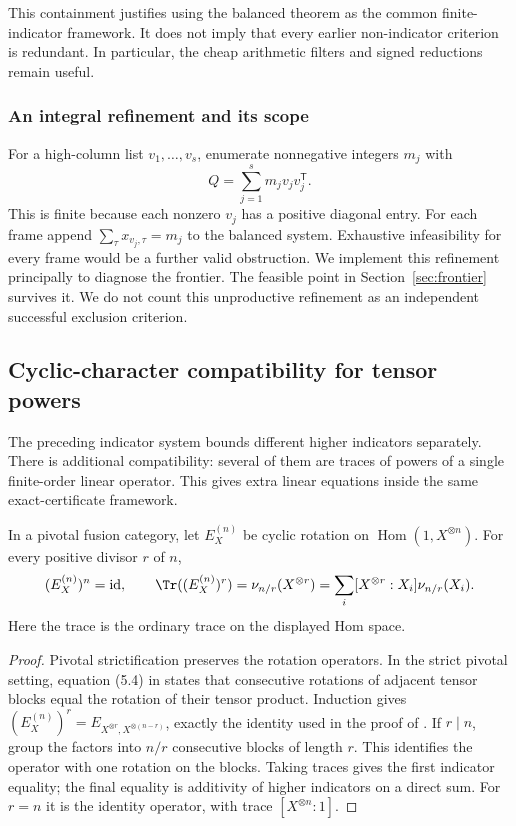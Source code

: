 This containment justifies using the balanced theorem as the common
finite-indicator framework. It does not imply that every earlier
non-indicator criterion is redundant. In particular, the cheap
arithmetic filters and signed reductions remain useful.

\subsubsection{An integral refinement and its scope}
For a high-column list $v_1,\ldots,v_s$, enumerate nonnegative integers
$m_j$ with
\begin{equation}\label{eq:integergram}
 Q=\sum_{j=1}^s m_jv_jv_j^{\mathsf T}.
\end{equation}
This is finite because each nonzero $v_j$ has a positive diagonal entry.
For each frame append
$\sum_\tau x_{v_j,\tau}=m_j$ to the balanced system. Exhaustive
infeasibility for every frame would be a further valid obstruction.
We implement this refinement principally to diagnose the frontier.
The feasible point in Section~\ref{sec:frontier} survives it. We do
not count this unproductive refinement as an independent successful
exclusion criterion.

\subsection{Cyclic-character compatibility for tensor powers}\label{sec:rotation}
The preceding indicator system bounds different higher indicators
separately. There is additional compatibility: several of them are
traces of powers of a single finite-order linear operator. This gives
extra linear equations inside the same exact-certificate framework.

\begin{lemma}\label{lem:blockrotation}
In a pivotal fusion category, let $E_X^{(n)}$ be cyclic rotation on
$\operatorname{Hom}(1,X^{\otimes n})$. For every positive divisor $r$ of $n$,
\begin{equation}\label{eq:blockrotation}
 (E_X^{(n)})^n=\mathrm{id},\qquad
 \Tr((E_X^{(n)})^r)=\nu_{n/r}(X^{\otimes r})
   =\sum_i[X^{\otimes r}:X_i]\nu_{n/r}(X_i).
\end{equation}
Here the trace is the ordinary trace on the displayed Hom space.
\end{lemma}
\begin{proof}
Pivotal strictification preserves the rotation operators. In the strict
pivotal setting, equation (5.4) in \cite{NSpiv} states that consecutive
rotations of adjacent tensor blocks equal the rotation of their tensor
product. Induction gives
$(E_X^{(n)})^r=E_{X^{\otimes r},X^{\otimes(n-r)}}$, exactly the identity
used in the proof of \cite[Theorem~5.1]{NSpiv}. If $r\mid n$, group the
factors into $n/r$ consecutive blocks of length $r$. This identifies the
operator with one rotation on the blocks. Taking traces gives the first
indicator equality; the final equality is additivity of higher
indicators on a direct sum. For $r=n$ it is the identity operator, with
trace $[X^{\otimes n}:1]$.
\end{proof}

